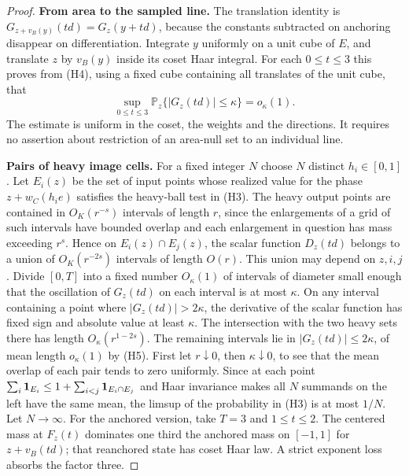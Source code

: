 \documentclass[11pt,a4paper]{article}
\begin{document}
\begin{proof}
\par\smallskip\noindent\textbf{From area to the sampled line.}\enspace
The translation identity is $G_{z+v_B(y)}(td)=G_z(y+td)$, because the
constants subtracted on anchoring disappear on differentiation. Integrate
$y$ uniformly on a unit cube of $E$, and translate $z$ by $v_B(y)$
inside its coset Haar integral. For each $0\le t\le3$ this proves from
(H4), using a fixed cube containing all translates of the unit cube, that
\[
  \sup_{0\le t\le3}\mathbb P_z\{|G_z(td)|\le\kappa\}=o_\kappa(1).
                                                                    \tag{H5}
\]
The estimate is uniform in the coset, the weights and the directions.
It requires no assertion about restriction of an area-null set to an
individual line.

\par\smallskip\noindent\textbf{Pairs of heavy image cells.}\enspace
For a fixed integer $N$ choose $N$ distinct $h_i\in[0,1]$. Let $E_i(z)$
be the set of input points whose realized value for the phase
$z+w_C(h_i e)$ satisfies the heavy-ball test in (H3). The heavy output
points are contained in $O_K(r^{-s})$ intervals of length $r$, since the
enlargements of a grid of such intervals have bounded overlap and each
enlargement in question has mass exceeding $r^s$. Hence on
$E_i(z)\cap E_j(z)$, the scalar function $D_z(td)$ belongs to a union
of $O_K(r^{-2s})$ intervals of length $O(r)$. This union may depend on
$z,i,j$. Divide $[0,T]$ into a fixed number $O_\kappa(1)$ of intervals
of diameter small enough that the oscillation of $G_z(td)$ on each
interval is at most $\kappa$. On any interval containing a point where
$|G_z(td)|>2\kappa$, the derivative of the scalar function has fixed
sign and absolute value at least $\kappa$. The intersection with the
two heavy sets there has length $O_\kappa(r^{1-2s})$. The remaining
intervals lie in $|G_z(td)|\le2\kappa$, of mean length $o_\kappa(1)$
by (H5). First let $r\downarrow0$, then $\kappa\downarrow0$, to see that
the mean overlap of each pair tends to zero uniformly. Since at each
point $\sum_i{\bf1}_{E_i}\le1+\sum_{i<j}{\bf1}_{E_i\cap E_j}$ and
Haar invariance makes all $N$ summands on the left have the same mean,
the limsup of the probability in (H3) is at most $1/N$. Let $N\to\infty$.
For the anchored version, take $T=3$ and $1\le t\le2$. The centered
mass at $F_z(t)$ dominates one third the anchored mass on $[-1,1]$
for $z+v_B(td)$; that reanchored state has coset Haar law. A strict
exponent loss absorbs the factor three.


\end{proof}
\end{document}
